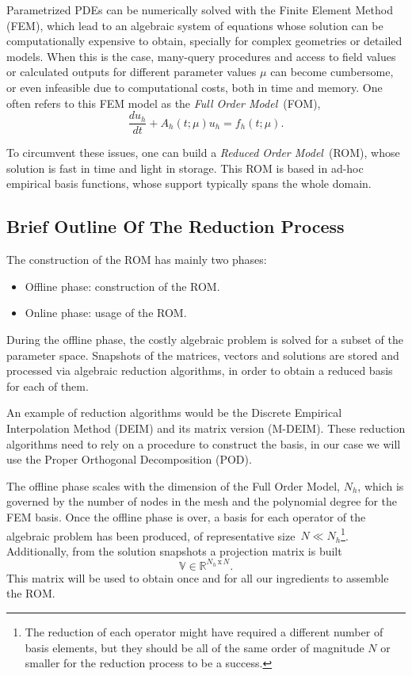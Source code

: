 \documentclass[../main.tex]{subfiles}
\begin{document}
Parametrized PDEs can be numerically solved with the Finite Element Method (FEM), which lead to an algebraic system of equations whose solution can be computationally expensive to obtain, specially for complex geometries or detailed models.
When this is the case, many-query procedures and access to field values or calculated outputs for different parameter values $\mu$ can become cumbersome, or even infeasible due to computational costs, both in time and memory.
One often refers to this FEM model as the \textit{Full Order Model}~(FOM),
\begin{equation*}
   \frac{du_h}{dt} + A_h\left(t;\mu\right) u_h = f_h\left(t;\mu\right).
\end{equation*}

To circumvent these issues, one can build a \textit{Reduced Order Model}~(ROM), whose solution is fast in time and light in storage.
This ROM is based in ad-hoc empirical basis functions, whose support typically spans the whole domain. 

\subsection{Brief Outline Of The Reduction Process}
The construction of the ROM has mainly two phases:
\begin{itemize}
   \item Offline phase: construction of the ROM.
   \item Online phase: usage of the ROM.
\end{itemize}

During the offline phase, the costly algebraic problem is solved for a subset of the parameter space.
Snapshots of the matrices, vectors and solutions are stored and processed via algebraic reduction algorithms, in order to obtain a reduced basis for each of them.

An example of reduction algorithms would be the Discrete Empirical Interpolation Method (DEIM) and its matrix version (M-DEIM).
These reduction algorithms need to rely on a procedure to construct the basis, in our case we will use the Proper Orthogonal Decomposition (POD). 

The offline phase scales with the dimension of the Full Order Model, $N_h$, which is governed by the number of nodes in the mesh and the polynomial degree for the FEM basis.
Once the offline phase is over, a basis for each operator of the algebraic problem has been produced, of representative size~$N \ll N_h$\footnote{
The reduction of each operator might have required a different number of basis elements, but they should be all of the same order of magnitude $N$ or smaller for the reduction process to be a success.}.
Additionally, from the solution snapshots a projection matrix is built
\begin{equation*}
   \mathbb{V} \in \mathbb{R}^{N_h \,\text{x}\, N}.
\end{equation*} 
This matrix will be used to obtain once and for all our ingredients to assemble the ROM.
\end{document}
